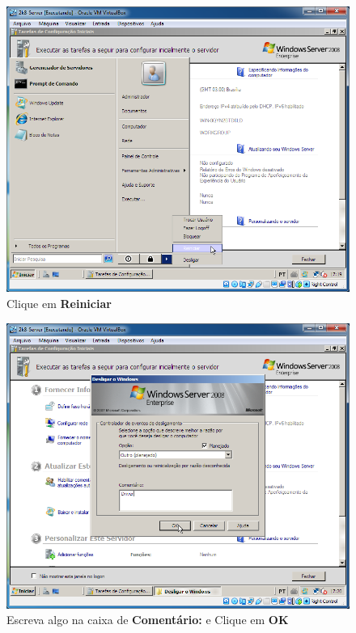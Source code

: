 \documentclass[10pt]{article}
\begin{document}
\begin{figure}[H]
    \centering
    \caption{Clique em \textbf{Reiniciar}}
    \label{fig:3139}
    \includegraphics[width=\linewidth]{images/ativacao_das_maquinas_virtuais/configuracao_inicial_das_maquinas_virtuais/039.png}
\end{figure}
\begin{figure}[H]
    \centering
    \caption{Escreva algo na caixa de \textbf{Comentário:} e {Clique em \textbf{OK}}}
    \label{fig:3141}
    \includegraphics[width=\linewidth]{images/ativacao_das_maquinas_virtuais/configuracao_inicial_das_maquinas_virtuais/041.png}
\end{figure}
\end{document}
